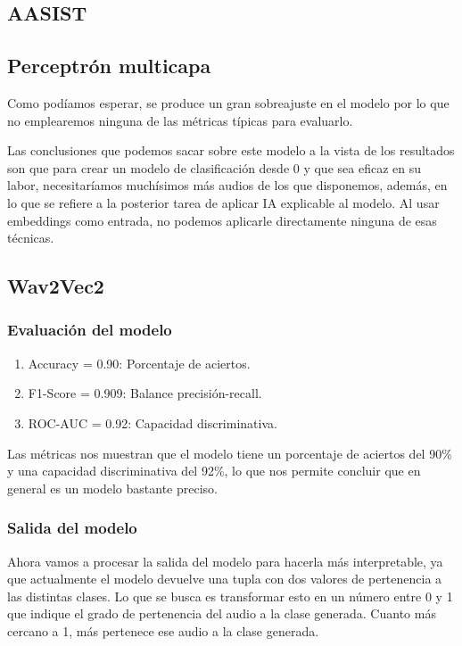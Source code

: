 \subsection{AASIST}
\label{subsubsec:res_aasist}



\subsection{Perceptrón multicapa}

Como podíamos esperar, se produce un gran sobreajuste en el modelo por lo que no emplearemos ninguna de las métricas típicas para evaluarlo.

Las conclusiones que podemos sacar sobre este modelo a la vista de los resultados son que para crear un modelo de clasificación desde 0 y que sea eficaz en su labor, necesitaríamos muchísimos más audios de los que disponemos, además, en lo que se refiere a la posterior tarea de aplicar IA explicable al modelo. Al usar embeddings como entrada, no podemos aplicarle directamente ninguna de esas técnicas.

\subsection{Wav2Vec2}

\subsubsection*{Evaluación del modelo}

\begin{enumerate}
 \item Accuracy = 0.90: Porcentaje de aciertos.
 \item F1-Score = 0.909: Balance precisión-recall.
 \item ROC-AUC = 0.92: Capacidad discriminativa.
\end{enumerate}

Las métricas nos muestran que el modelo tiene un porcentaje de aciertos del 90\% y una capacidad discriminativa del 92\%, lo que nos permite concluir que en general es un modelo bastante preciso.

\subsubsection*{Salida del modelo}

Ahora vamos a procesar la salida del modelo para hacerla más interpretable, ya que actualmente el modelo devuelve una tupla con dos valores de pertenencia a las distintas clases. Lo que se busca es transformar esto en un número entre 0 y 1 que indique el grado de pertenencia del audio a la clase generada. Cuanto más cercano a 1, más pertenece ese audio a la clase generada.

